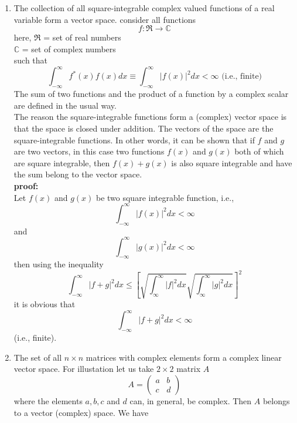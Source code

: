 \begin{enumerate}
	
	\item 
	The collection of all square-integrable complex valued functions of a real variable form a vector space. consider all functions
	\begin{equation}\label{eqn:2.17}
	f:\Re \rightarrow \mathbb{C}
	\end{equation}
	here, 
	$\Re $ =  set of real numbers \\
	$\mathbb{C}$  = set of complex numbers\\
	such that
	\begin{equation}\label{eqn:2.18}
	\int_{-\infty}^{\infty} f^*(x) f(x) dx \equiv \int_{-\infty}^{\infty} |f(x)|^2 dx < \infty \text{\  \ (i.e., finite)}
	\end{equation}
	The sum of two functions and the product of a function by a complex scalar are defined in the usual way.\\
	The reason the square-integrable functions form a (complex) vector space is that the space is closed under addition. The vectors of the space are the square-integrable functions. In other words, it can be shown that if $f$ and $g$ are two vectors, in this case two functions $f(x)$ and $g(x)$ both of which are square integrable, then $f(x) + g(x)$ is also square integrable and have the sum belong to the vector space.\\
	\textbf{proof:} \\
	Let $f(x)$ and $g(x)$ be two square integrable function, i.e., 
	\begin{equation}\label{eqn:2.19}
	\int_{-\infty}^{\infty} |f(x)|^2 dx < \infty
	\end{equation}
	and
	\begin{equation}\label{eqn:2.20}
	\int_{-\infty}^{\infty} |g(x)|^2 dx < \infty
	\end{equation}
	then using the inequality
	\begin{equation}\label{eqn:2.21}
	\int_{-\infty}^{\infty} |f+g|^2 dx \leq \left[\sqrt{\int_{\infty}^{\infty} |f|^2 dx} \sqrt{\int_{\infty}^{\infty} |g|^2 dx}\right]^2
	\end{equation}
	it is obvious that
	\begin{equation}\label{eqn:2.22}
	\int_{-\infty}^{\infty} |f+g|^2 dx < \infty
	\end{equation}
	(i.e., finite).
	
	\item 
	The set of all $n\times n$ matrices with complex elements form a complex linear vector space. For illustation let us take $2\times 2$ matrix $A$
	\begin{equation}\label{eqn:2.23}
	A = \left(			
	\begin{matrix}
	a & b \\
	c & d
	\end{matrix}
	\right)
	\end{equation}
	where the elements $a, b, c$ and $d$ can, in general, be complex. Then $A$ belongs to a vector (complex) space.
	We have
	

\end{enumerate}
